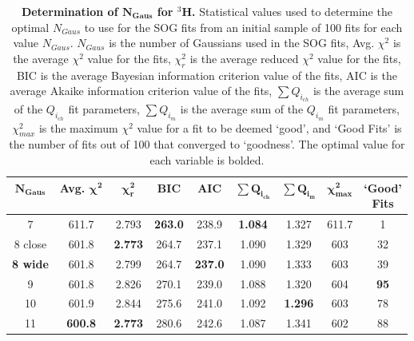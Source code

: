 \vspace{6mm}
\begin{table}[!h]
\centering
\begin{tabular}{|c c c c c c c c c|}
\hline
\textbf{$\boldsymbol{N_{Gaus}}$} & \textbf{Avg. $\boldsymbol{\chi^2}$} & \textbf{$\boldsymbol{\chi^2_r}$} & \textbf{BIC} & \textbf{AIC} & \textbf{$\boldsymbol{\sum Q_{i_{ch}}}$} & \textbf{$\boldsymbol{\sum Q_{i_{m}}}$} & \textbf{$\boldsymbol{\chi^2_{max}}$} & \makecell{\textbf{`Good'}\\ \textbf{Fits}} \\
\hline
7 & 611.7 & 2.793 & \textbf{263.0} & 238.9 & \textbf{1.084} & 1.327 & 611.7 & 1\\
8 close & 601.8 & \textbf{2.773} & 264.7 & 237.1 & 1.090 & 1.329 & 603 & 32\\
\textbf{8 wide} & 601.8 & 2.799 & 264.7 & \textbf{237.0} & 1.090 & 1.333 & 603 & 39\\
9 & 601.8 & 2.826 & 270.1 & 239.0 & 1.088 & 1.320 & 604 & \textbf{95}\\
10 & 601.9 & 2.844 & 275.6 & 241.0 & 1.092 & \textbf{1.296} & 603 & 78\\
11 & \textbf{600.8} & \textbf{2.773} & 280.6 & 242.6 & 1.087 & 1.341 & 602 & 88\\
\hline
\end{tabular}
\caption[Determination of $N_{Gaus}$ for $^3$H]{{\bf{Determination of $\boldsymbol{N_{Gaus}}$ for $^3$H.}} Statistical values used to determine the optimal $N_{Gaus}$ to use for the SOG fits from an initial sample of 100 fits for each value $N_{Gaus}$. $N_{Gaus}$ is the number of Gaussians used in the SOG fits, Avg. $\chi^2$ is the average $\chi^2$ value for the fits, $\chi^2_r$ is the average reduced $\chi^2$ value for the fits, BIC is the average Bayesian information criterion value of the fits, AIC is the average Akaike information criterion value of the fits, $\sum Q_{i_{ch}}$ is the average sum of the $Q_{i_{ch}}$ fit parameters, $\sum Q_{i_{m}}$ is the average sum of the $Q_{i_{m}}$ fit parameters, $\chi^2_{max}$ is the maximum $\chi^2$ value for a fit to be deemed `good', and `Good Fits' is the number of fits out of 100 that converged to `goodness'. The optimal value for each variable is bolded.}
\label{tab:3h_ngaus}
\end{table}

